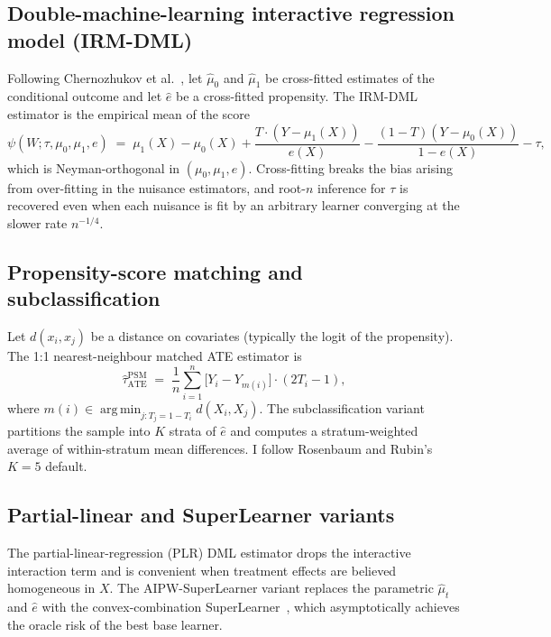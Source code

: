 \documentclass[11pt,a4paper]{article}
\theoremstyle{plain}
\theoremstyle{definition}
\theoremstyle{remark}
\DeclareMathOperator*{\argmin}{arg\,min}
\begin{document}
\subsection{Double-machine-learning interactive regression model (IRM-DML)}

Following Chernozhukov et al.~\cite{Chernozhukov2018DoubleML},
let $\hat{\mu}_{0}$ and $\hat{\mu}_{1}$ be cross-fitted estimates
of the conditional outcome and let $\hat{e}$ be a cross-fitted
propensity. The IRM-DML estimator is the empirical mean of the
score
\begin{equation}
  \psi(W; \tau, \mu_{0}, \mu_{1}, e)
  \;=\; \mu_{1}(X) - \mu_{0}(X)
   + \frac{T \cdot (Y - \mu_{1}(X))}{e(X)}
   - \frac{(1-T)(Y - \mu_{0}(X))}{1 - e(X)} - \tau,
  \label{eq:irm-score}
\end{equation}
which is Neyman-orthogonal in $(\mu_{0}, \mu_{1}, e)$. Cross-fitting
breaks the bias arising from over-fitting in the nuisance
estimators, and root-$n$ inference for $\tau$ is recovered even
when each nuisance is fit by an arbitrary learner converging at
the slower rate $n^{-1/4}$.

\subsection{Propensity-score matching and subclassification}

Let $d(x_{i}, x_{j})$ be a distance on covariates (typically the
logit of the propensity). The 1:1 nearest-neighbour matched ATE
estimator is
\begin{equation}
  \widehat{\tau}^{\mathrm{PSM}}_{\mathrm{ATE}} \;=\;
   \frac{1}{n} \sum_{i=1}^{n}
   \bigl[Y_{i} - Y_{m(i)}\bigr]
   \cdot (2T_{i} - 1),
  \label{eq:psm}
\end{equation}
where $m(i) \in \argmin_{j : T_{j} = 1 - T_{i}} d(X_{i}, X_{j})$.
The subclassification variant partitions the sample into $K$
strata of $\hat{e}$ and computes a stratum-weighted average of
within-stratum mean differences. I follow Rosenbaum and Rubin's
$K = 5$ default.

\subsection{Partial-linear and SuperLearner variants}

The partial-linear-regression (PLR) DML estimator drops the
interactive interaction term and is convenient when treatment
effects are believed homogeneous in $X$. The
AIPW-SuperLearner variant replaces the parametric $\hat{\mu}_{t}$
and $\hat{e}$ with the convex-combination
SuperLearner~\cite{vanderLaan2007SuperLearner}, which
asymptotically achieves the oracle risk of the best base learner.
\end{document}
